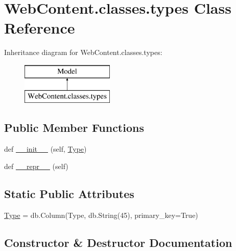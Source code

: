 \hypertarget{class_web_content_1_1classes_1_1types}{}\section{Web\+Content.\+classes.\+types Class Reference}
\label{class_web_content_1_1classes_1_1types}
Inheritance diagram for Web\+Content.\+classes.\+types\+:\begin{figure}[H]
\begin{center}
\leavevmode
\includegraphics[height=2.000000cm]{class_web_content_1_1classes_1_1types}
\end{center}
\end{figure}
\subsection*{Public Member Functions}
\begin{DoxyCompactItemize}
\item 
def \hyperlink{class_web_content_1_1classes_1_1types_a87e09373df434b5bd47377d8399af113}{\+\_\+\+\_\+init\+\_\+\+\_\+} (self, \hyperlink{class_web_content_1_1classes_1_1types_a14ba7df18201fb701b0408d06bc4c058}{Type})
\item 
def \hyperlink{class_web_content_1_1classes_1_1types_ad63c238527b3bf635f67442625dc976e}{\+\_\+\+\_\+repr\+\_\+\+\_\+} (self)
\end{DoxyCompactItemize}
\subsection*{Static Public Attributes}
\begin{DoxyCompactItemize}
\item 
\hyperlink{class_web_content_1_1classes_1_1types_a14ba7df18201fb701b0408d06bc4c058}{Type} = db.\+Column(\textquotesingle{}Type\textquotesingle{}, db.\+String(45), primary\+\_\+key=True)
\end{DoxyCompactItemize}


\subsection{Constructor \& Destructor Documentation}
\mbox{\label{class_web_content_1_1classes_1_1types_a87e09373df434b5bd47377d8399af113}} 
